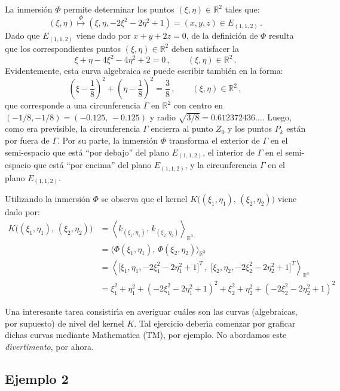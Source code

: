 \smallskip\noindent
La inmersi\'on $\Phi$ permite determinar los puntos
$(\xi,\eta)\in\mathbb{R}^2$ tales que:
$$
(\xi,\eta) \overset{\Phi}{\longmapsto} 
(\xi,\eta,-2\xi^2-2\eta^2+1) = (x,y,z)\in E_{(1,1,2)}\,.
$$
Dado que $E_{(1,1,2)}$ viene dado por $x+y+2z=0$, de la definici\'on de
$\Phi$ resulta que los correspondientes puntos $(\xi,\eta)\in\mathbb{R}^2$
deben satisfacer la 
$$
\xi + \eta - 4\xi^2 - 4\eta^2 + 2 = 0\,,\qquad
(\xi,\eta)\in\mathbb{R}^2\,.
$$
Evidentemente, esta curva algebraica se puede escribir tambi\'en en la
forma:
$$
\left( \xi-\frac18 \right)^2 + \left( \eta-\frac18 \right)^2
= \frac38\,,\qquad (\xi,\eta)\in\mathbb{R}^2\,,
$$
que corresponde a una circunferencia $\Gamma$ en $\mathbb{R}^2$
con centro en $(-1/8,-1/8)=(-0.125,\,-0.125)$ y radio 
$\sqrt{3/8}=0.612372436\dots$.
Luego, como era previsible, la circunferencia $\Gamma$ encierra
al punto $Z_0$ y los puntos $P_k$ est\'an por fuera de $\Gamma$.
Por su parte, la inmersi\'on $\Phi$ transforma
el exterior de $\Gamma$ en el semi-espacio que est\'a
``por debajo'' del plano $E_{(1,1,2)}$, 
el interior de $\Gamma$ en el semi-espacio que est\'a
``por encima'' del plano $E_{(1,1,2)}$, y
la circunferencia $\Gamma$ en el plano $E_{(1,1,2)}$.

\smallskip\noindent
Utilizando la inmersi\'on $\Phi$ se observa que el kernel
$K\big( (\xi_1,\eta_1),\,(\xi_2,\eta_2) \big)$ viene dado por:
\begin{align*}
K\big( (\xi_1,\eta_1),\,(\xi_2,\eta_2) \big)
&= \left\langle k_{(\xi_1,\eta_1)},\,k_{(\xi_2,\eta_2)}
   \right\rangle_{\mathbb{R}^3} \\
&= \big\langle \Phi(\xi_1,\eta_1),\,\Phi(\xi_2,\eta_2)
   \big\rangle_{\mathbb{R}^3} \\
&= \left\langle \big[\xi_1,\eta_1,-2\xi_1^2-2\eta_1^2+1\big]^T\,,\;
   \big[\xi_2,\eta_2,-2\xi_2^2-2\eta_2^2+1\big]^T
   \right\rangle_{\mathbb{R}^3} \\
&= \xi_1^2 + \eta_1^2 + \left(-2\xi_1^2-2\eta_1^2+1\right)^2 +
   \xi_2^2 + \eta_2^2 + \left(-2\xi_2^2-2\eta_2^2+1\right)^2
\end{align*} 





Una interesante tarea consistir\'\i a en averiguar cu\'ales son
las curvas (algebraicas, por supuesto) de nivel del kernel $K$.
Tal ejercicio deber\'\i a comenzar por graficar dichas curvas
mediante Mathematica (TM), por ejemplo.
No abordamos este {\em divertimento\/}, por ahora.

\subsection{Ejemplo 2}

